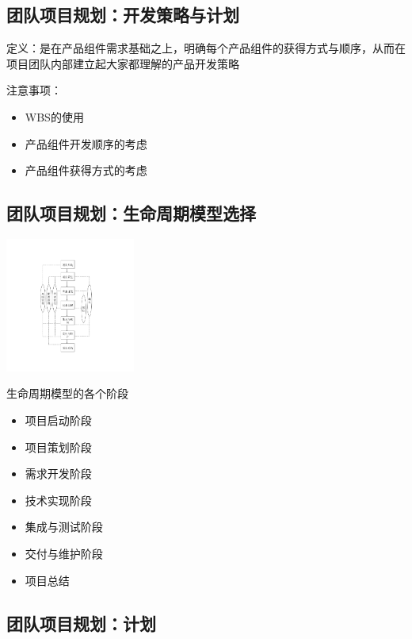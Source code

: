 \subsection{团队项目规划：开发策略与计划}
定义：是在产品组件需求基础之上，明确每个产品组件的获得方式与顺序，从而在项目团队内部建立起大家都理解的产品开发策略

注意事项：
\vspace{-0.8em}
\begin{multicols}{3}
    \begin{itemize}
        \item WBS的使用
        \item 产品组件开发顺序的考虑
        \item 产品组件获得方式的考虑
    \end{itemize}
\end{multicols}
\vspace{-1em}

\subsection{团队项目规划：生命周期模型选择}
\begin{table}
    \centering
    \vspace{-4.5em}
    \includegraphics[width=0.32\textwidth]{images/生命周期模型.pdf}
    \vspace{-10.5em}
\end{table}
生命周期模型的各个阶段
\begin{itemize}
    \item 项目启动阶段
    \item 项目策划阶段
    \item 需求开发阶段
    \item 技术实现阶段
    \item 集成与测试阶段
    \item 交付与维护阶段
    \item 项目总结
\end{itemize}

\subsection{团队项目规划：计划}

